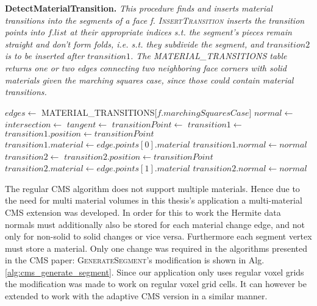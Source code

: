 \begin{algorithm}[H]
\caption{\textbf{DetectMaterialTransition.} \textit{This procedure finds and inserts material transitions into the segments of a face f. \textsc{InsertTransition} inserts the transition points into $f.list$ at their appropriate indices s.t. the segment's pieces remain straight and don't form folds, i.e. s.t. they subdivide the segment, and $transition2$ is to be inserted after $transition1$. The MATERIAL\_TRANSITIONS table returns one or two edges connecting two neighboring face corners with solid materials given the marching squares case, since those could contain material transitions.}}\label{alg:cms_detect_material_transition}
\begin{algorithmic}[1]
		\State $edges \gets $ MATERIAL\_TRANSITIONS[$f.marchingSquaresCase$]
			\State $normal \gets $
			 
				\State $intersection \gets $
				\State $tangent \gets $
					 
							\State $transitionPoint \gets $
							\State $transition1 \gets $
							\State $transition1.position \gets transitionPoint$
							\State $transition1.material \gets edge.points[0].material$
							\State $transition1.normal \gets normal$
							\State $transition2 \gets $
							\State $transition2.position \gets transitionPoint$
							\State $transition2.material \gets edge.points[1].material$
							\State $transition2.normal \gets normal$
							\State {}
						\EndIf
					\EndFor
				\EndFor
			\EndIf
		\EndFor
	\EndIf
\EndProcedure
\end{algorithmic}
\end{algorithm}


The regular CMS algorithm does not support multiple materials. Hence due to the need for multi material volumes in this thesis's application
a multi-material CMS extension was developed. In order for this to work the Hermite data normals must additionally also be stored for each material change edge, and not only for non-solid
to solid changes or vice versa. Furthermore each segment vertex must store a material.
Only one change was required in the algorithms presented in the CMS paper: \textsc{GenerateSegment}'s modification is shown in Alg. \ref{alg:cms_generate_segment}.
Since our application only uses regular voxel grids the modification was made to work on regular voxel grid cells. It can however be extended to work with the adaptive CMS version
in a similar manner.

